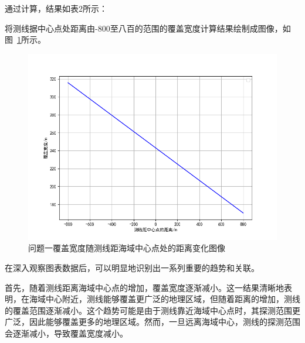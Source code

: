 \documentclass[withoutpreface,bwprint]{cumcmthesis} %
\begin{document}
    通过计算，结果如表2所示：
    \begin{table}[!htbp]
        \caption{问题一的计算结果} 
        \centering
    \end{table}

    将测线据中心点处距离由-800至八百的范围的覆盖宽度计算结果绘制成图像，如图~\ref{6}所示。
    \begin{figure}[htbp]
        \centering
        \includegraphics[width=.5\textwidth]{myplot1.png}
        \caption{问题一覆盖宽度随测线距海域中心点处的距离变化图像}
        \label{6}
    \end{figure}


    在深入观察图表数据后，可以明显地识别出一系列重要的趋势和关联。

    首先，随着测线距离海域中心点的增加，覆盖宽度逐渐减小。这一结果清晰地表明，在海域中心附近，测线能够覆盖更广泛的地理区域，但随着距离的增加，测线的覆盖范围逐渐减小。这个趋势可能是由于测线靠近海域中心点时，其探测范围更广泛，因此能够覆盖更多的地理区域。然而，一旦远离海域中心，测线的探测范围会逐渐减小，导致覆盖宽度减小。
    
\end{document}
